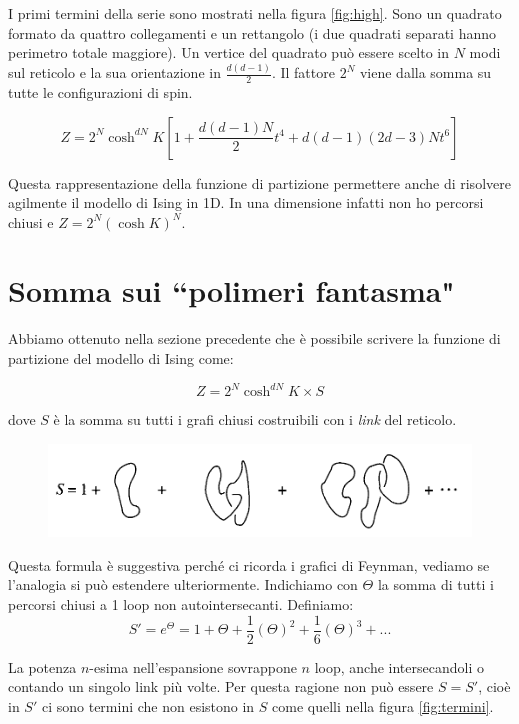 \documentclass[12pt,a4paper]{article}
\begin{document}
I primi termini della serie sono mostrati nella figura \ref{fig:high}. Sono un quadrato formato da quattro collegamenti e un rettangolo (i due quadrati separati hanno perimetro totale maggiore). Un vertice del quadrato può essere scelto in $N$ modi sul reticolo e la sua orientazione in $\frac{d(d-1)}{2}$. Il fattore $2^{N}$ viene dalla somma su tutte le configurazioni di spin.

\[
Z = 2^N  \cosh ^{d N} K \left[ 1 + \frac{d(d-1) N}{2} t^4 + d(d-1)(2d -3) N t ^6\right]
\]

Questa rappresentazione della funzione di partizione permettere anche di risolvere agilmente il modello di Ising in 1D. In una dimensione infatti non ho percorsi chiusi e $Z = 2^N \left( \cosh K \right) ^{N}$.

\section{Somma sui ``polimeri fantasma"}

Abbiamo ottenuto nella sezione precedente che è possibile scrivere la funzione di partizione del modello di Ising come:

\[
Z = 2^N \cosh^{dN} K \times S
\]

dove $S$ è la somma su tutti i grafi chiusi costruibili con i \emph{link} del reticolo. 


\begin{figure}[!htb]
\centering
\includegraphics[scale=0.30]{loop.png}
\label{fig:loop}
\end{figure}

Questa formula è suggestiva perché ci ricorda i grafici di Feynman, vediamo se l'analogia si può estendere ulteriormente. Indichiamo con $\Theta$ la somma di tutti i percorsi chiusi a 1 loop non autointersecanti. Definiamo: \[S' = e^{\Theta} = 1 + \Theta + \frac{1}{2} \left( \Theta \right)^2 + \frac{1}{6} \left( \Theta \right)^3 + ... \]

La potenza $n$-esima nell'espansione sovrappone $n$ loop, anche intersecandoli o contando un singolo link più volte. Per questa ragione non può essere $S = S'$, cioè in $S'$ ci sono termini che non esistono in $S$ come quelli nella figura \ref{fig:termini}.
\end{document}
